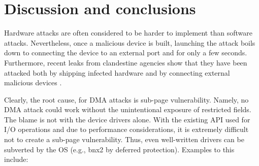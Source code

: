 

\section{Discussion and conclusions}

Hardware attacks are often considered to be harder to implement than software attacks. Nevertheless, once a malicious device is built, launching the attack boils down to connecting the device to an external port and for only a few seconds. Furthermore, recent leaks from clandestine agencies show that they have been attacked both by shipping infected hardware \cite{Gal14} and by connecting external malicious devices \cite{Fin14}. 

\begin{comment}
\footnote{\url{https://lore.kernel.org/lkml/20180510230948.GF190385@bhelgaas-glaptop.roam.corp.google.com/}}.
\end{comment}

Clearly, the root cause, for DMA attacks is sub-page vulnerability. Namely, no DMA attack could work without the unintentional exposure of restricted fields. The blame is not with the device drivers alone. With the existing API used for I/O operations and due to performance considerations, it is extremely difficult not to create a sub-page vulnerability. Thus, even well-written drivers can be subverted by the OS (e.g., bnx2 by deferred protection). Examples to this include:


